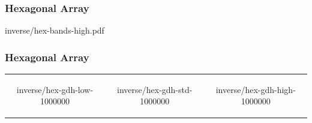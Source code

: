% 

\begin{frame}\frametitle{Hexagonal Array}
\center
	\begin{overpic}[ scale = 0.55 ]
		{\pLocalGraphics inverse/hex-bands-high.pdf}
	\end{overpic}
\end{frame}
%
\begin{frame}\frametitle{Hexagonal Array}
\begin{table}[htp]
\begin{center}
	\begin{tabular}{ccc}
		\begin{overpic}[ scale = 0.325 ] {\pLocalGraphics inverse/hex-gdh-low-1000000} \end{overpic} &
		\begin{overpic}[ scale = 0.325 ] {\pLocalGraphics inverse/hex-gdh-std-1000000} \end{overpic} &
		\begin{overpic}[ scale = 0.325 ] {\pLocalGraphics inverse/hex-gdh-high-1000000} \end{overpic} 
	\end{tabular}
\end{center}
\end{table}%
\end{frame}

\endinput  %
